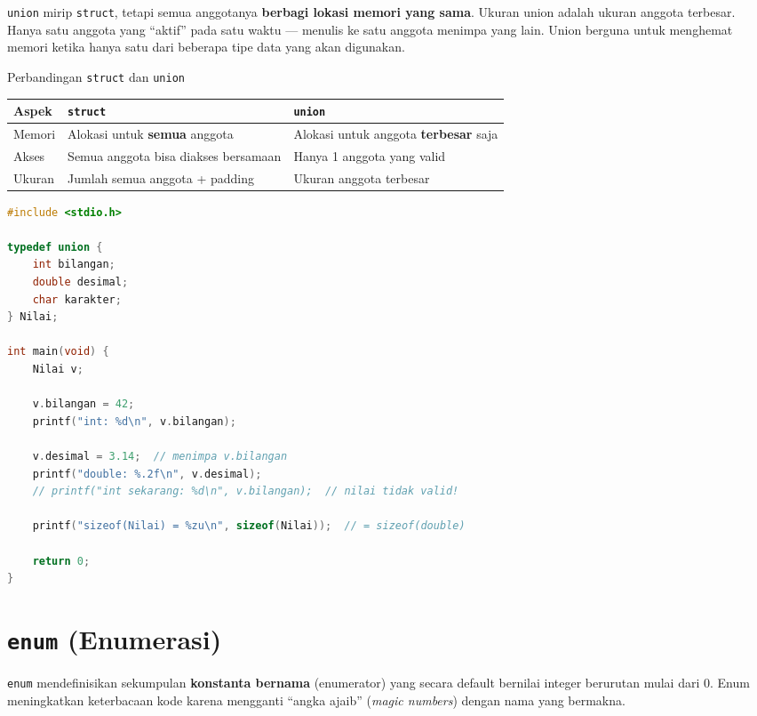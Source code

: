 \documentclass[../main.tex]{subfiles}
\begin{document}
\texttt{union} mirip \texttt{struct}, tetapi semua anggotanya \textbf{berbagi lokasi memori yang sama}. Ukuran union adalah ukuran anggota terbesar. Hanya satu anggota yang ``aktif'' pada satu waktu --- menulis ke satu anggota menimpa yang lain. Union berguna untuk menghemat memori ketika hanya satu dari beberapa tipe data yang akan digunakan.

\begin{modultable}[]{Perbandingan \texttt{struct} dan \texttt{union}}
\begin{tabular}{|l|p{5cm}|p{5cm}|}
\hline
\textbf{Aspek} & \texttt{\textbf{struct}} & \texttt{\textbf{union}} \\
\hline
Memori & Alokasi untuk \textbf{semua} anggota & Alokasi untuk anggota \textbf{terbesar} saja \\
\hline
Akses & Semua anggota bisa diakses bersamaan & Hanya 1 anggota yang valid \\
\hline
Ukuran & Jumlah semua anggota + padding & Ukuran anggota terbesar \\
\hline
\end{tabular}
\end{modultable}

\begin{lstlisting}[language=C,caption=Penggunaan \texttt{union}]
#include <stdio.h>

typedef union {
    int bilangan;
    double desimal;
    char karakter;
} Nilai;

int main(void) {
    Nilai v;
    
    v.bilangan = 42;
    printf("int: %d\n", v.bilangan);
    
    v.desimal = 3.14;  // menimpa v.bilangan
    printf("double: %.2f\n", v.desimal);
    // printf("int sekarang: %d\n", v.bilangan);  // nilai tidak valid!
    
    printf("sizeof(Nilai) = %zu\n", sizeof(Nilai));  // = sizeof(double)
    
    return 0;
}
\end{lstlisting}

\section{\texttt{enum} (Enumerasi)}

\texttt{enum} mendefinisikan sekumpulan \textbf{konstanta bernama} (enumerator) yang secara default bernilai integer berurutan mulai dari 0. Enum meningkatkan keterbacaan kode karena mengganti ``angka ajaib'' (\textit{magic numbers}) dengan nama yang bermakna.
\end{document}
